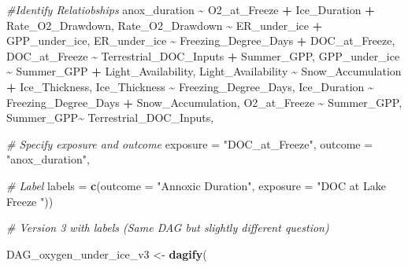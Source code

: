 \documentclass[
]{article}
\newenvironment{Shaded}{\begin{snugshade}}{\end{snugshade}}
\newcommand{\AttributeTok}[1]{\textcolor[rgb]{0.13,0.29,0.53}{#1}}
\newcommand{\CommentTok}[1]{\textcolor[rgb]{0.56,0.35,0.01}{\textit{#1}}}
\newcommand{\FunctionTok}[1]{\textcolor[rgb]{0.13,0.29,0.53}{\textbf{#1}}}
\newcommand{\NormalTok}[1]{#1}
\newcommand{\OtherTok}[1]{\textcolor[rgb]{0.56,0.35,0.01}{#1}}
\newcommand{\SpecialCharTok}[1]{\textcolor[rgb]{0.81,0.36,0.00}{\textbf{#1}}}
\newcommand{\StringTok}[1]{\textcolor[rgb]{0.31,0.60,0.02}{#1}}
\begin{document}
\begin{Shaded}
\begin{Highlighting}[]
      \CommentTok{\#Identify Relatiobships }
\NormalTok{      anox\_duration }\SpecialCharTok{\textasciitilde{}}\NormalTok{ O2\_at\_Freeze }\SpecialCharTok{+}\NormalTok{ Ice\_Duration }\SpecialCharTok{+}\NormalTok{ Rate\_O2\_Drawdown,}
\NormalTok{      Rate\_O2\_Drawdown }\SpecialCharTok{\textasciitilde{}}\NormalTok{ ER\_under\_ice }\SpecialCharTok{+}\NormalTok{ GPP\_under\_ice, }
\NormalTok{      ER\_under\_ice }\SpecialCharTok{\textasciitilde{}}\NormalTok{ Freezing\_Degree\_Days }\SpecialCharTok{+}\NormalTok{ DOC\_at\_Freeze,}
\NormalTok{      DOC\_at\_Freeze }\SpecialCharTok{\textasciitilde{}}\NormalTok{ Terrestrial\_DOC\_Inputs }\SpecialCharTok{+}\NormalTok{ Summer\_GPP, }
\NormalTok{      GPP\_under\_ice }\SpecialCharTok{\textasciitilde{}}\NormalTok{ Summer\_GPP }\SpecialCharTok{+}\NormalTok{ Light\_Availability,}
\NormalTok{      Light\_Availability }\SpecialCharTok{\textasciitilde{}}\NormalTok{ Snow\_Accumulation }\SpecialCharTok{+}\NormalTok{ Ice\_Thickness,}
\NormalTok{      Ice\_Thickness }\SpecialCharTok{\textasciitilde{}}\NormalTok{ Freezing\_Degree\_Days,}
\NormalTok{      Ice\_Duration }\SpecialCharTok{\textasciitilde{}}\NormalTok{ Freezing\_Degree\_Days }\SpecialCharTok{+}\NormalTok{ Snow\_Accumulation, }
\NormalTok{      O2\_at\_Freeze }\SpecialCharTok{\textasciitilde{}}\NormalTok{ Summer\_GPP,}
\NormalTok{      Summer\_GPP}\SpecialCharTok{\textasciitilde{}}\NormalTok{ Terrestrial\_DOC\_Inputs,}
    
      \CommentTok{\# Specify exposure and outcome }
      \AttributeTok{exposure =} \StringTok{"DOC\_at\_Freeze"}\NormalTok{, }
      \AttributeTok{outcome =} \StringTok{"anox\_duration"}\NormalTok{,}
      
      \CommentTok{\# Label }
      \AttributeTok{labels =} \FunctionTok{c}\NormalTok{(}\AttributeTok{outcome =} \StringTok{"Annoxic Duration"}\NormalTok{,}
                 \AttributeTok{exposure =} \StringTok{"DOC at Lake Freeze "}\NormalTok{))}
    
\CommentTok{\# Version 3 with labels (Same DAG but slightly different question)}

\NormalTok{    DAG\_oxygen\_under\_ice\_v3 }\OtherTok{\textless{}{-}} \FunctionTok{dagify}\NormalTok{(}
      

\end{Highlighting}
\end{Shaded}
\end{document}
